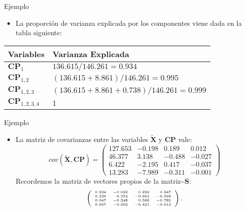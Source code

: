 \documentclass[
  spanish,
  ignorenonframetext,
]{beamer}
\providecommand{\tightlist}{%
  \setlength{\itemsep}{0pt}\setlength{\parskip}{0pt}}
\begin{document}
\begin{frame}{Ejemplo}
\protect\hypertarget{ejemplo-13}{}
\begin{itemize}
\tightlist
\item
  La proporción de varianza explicada por los componentes viene dada en
  la tabla siguiente:
\end{itemize}

\begin{tabular}{|l|l|}\hline
Variables&Varianza Explicada\\\hline
$\mathbf{CP}_1$&$136.615/146.261=0.934$\\\hline
$\mathbf{CP}_{1,2}$&$(136.615+8.861)/146.261=0.995$\\\hline
$\mathbf{CP}_{1,2,3}$&$(136.615+8.861+0.738)/146.261=0.999$\\\hline
$\mathbf{CP}_{1,2,3,4}$&$1$\\\hline
\end{tabular}
\end{frame}

\begin{frame}{Ejemplo}
\protect\hypertarget{ejemplo-14}{}
\begin{itemize}
\tightlist
\item
  La matriz de covarianzas entre las variables \(\tilde{\mathbf{X}}\) y
  \(\mathbf{CP}\) vale: \[
  cov(\tilde{\mathbf{X}},\mathbf{CP})=
  \left(
  \begin{array}{rrrr}
  127.653 & -0.198 & 0.189 & 0.012 \\
   46.377 & 3.138 & -0.488 & -0.027 \\
   6.422 & -2.195 & 0.417 & -0.037 \\
   13.283 & -7.989 & -0.311 & -0.001 
  \end{array}
  \right)
  \] Recordemos la matriz de vectores propios de la
  matriz\textasciitilde{}\(\mathbf{S}\): \[
  {\tiny \left(
  \begin{array}{rrrr}
  0.934 & -0.022 & 0.256 & 0.247 \\
   0.339 & 0.354 & -0.661 & -0.568 \\
   0.047 & -0.248 & 0.566 & -0.785 \\
   0.097 & -0.902 & -0.421 & -0.013 
  \end{array}
  \right)
  .}
  \]
\end{itemize}
\end{frame}
\end{document}
